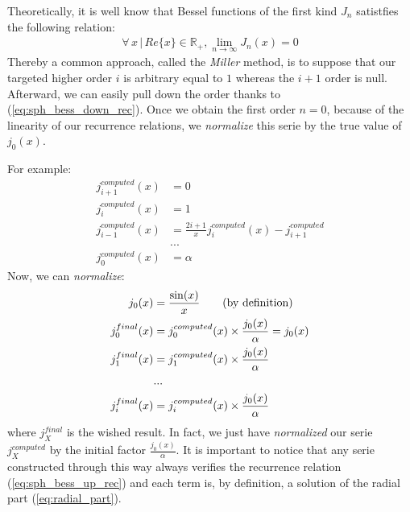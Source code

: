 \documentclass{article}
\numberwithin{equation}{section}
\begin{document}
Theoretically, it is well know that Bessel functions of the first kind $J_{n}$ satistfies the following relation:
\begin{align}
\forall\,x\,|\,Re\{x\} \in\mathbb{R}_{+}, \lim_{n \to \infty } J_{n}(x)=0
\end{align}
Thereby a common approach, called the \textit{Miller} method, is to suppose that our targeted higher order $i$ is arbitrary equal to $1$ whereas the $i+1$ order is null. Afterward, we can easily pull down the order thanks to (\ref{eq:sph_bess_down_rec}). Once we obtain the first order $n=0$, because of the linearity of our recurrence relations, we \textit{normalize} this serie by the true value of $j_{0}(x)$. 

For example:
\begin{equation}\label{eq:j_computed}
\begin{aligned}
j^{computed}_{i+1}(x) &= 0\\
j^{computed}_{i}(x) &= 1\\
j^{computed}_{i-1}(x) &= \frac{2i+1}{x}j^{computed}_{i}(x) - j^{computed}_{i+1}\\
&...\\
j^{computed}_{0}(x) &= \alpha
\end{aligned}
\end{equation}
Now, we can \textit{normalize}:
\begin{equation}\label{eq:j_final}
\begin{aligned}
j_{0}(x) &= \frac{\sin(x)}{x} \qquad\textnormal{(by definition)}\\
j^{final}_{0}(x) &= j^{computed}_{0}(x) \times \frac{j_{0}(x)}{\alpha} = j_{0}(x)\\
j^{final}_{1}(x) &= j^{computed}_{1}(x) \times \frac{j_{0}(x)}{\alpha}\\
&...\\
j^{final}_{i}(x) &= j^{computed}_{i}(x) \times \frac{j_{0}(x)}{\alpha}\\
\end{aligned}
\end{equation}
where $j^{final}_{X}$ is the wished result. In fact, we just have \textit{normalized} our serie $j^{computed}_{X}$ by the initial factor $\frac{j_{0}(x)}{\alpha}$. It is important to notice that any serie constructed through this way always verifies the recurrence relation (\ref{eq:sph_bess_up_rec}) and each term is, by definition, a solution of the radial part (\ref{eq:radial_part}).
\end{document}
